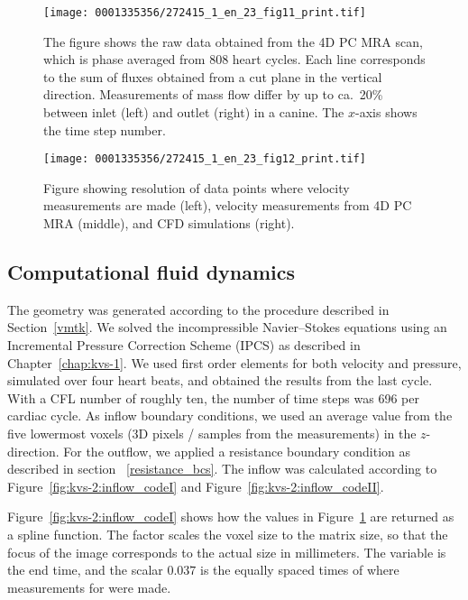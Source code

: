 \begin{figure}[!t]
  \centering
  \texttt{[image: 0001335356/272415\_1\_en\_23\_fig11\_print.tif]}
  \caption{The figure shows the raw data obtained from the 4D PC MRA scan,
    which is phase averaged from 808 heart cycles. Each line corresponds to
    the sum of fluxes obtained from a cut plane in the vertical direction.
    Measurements of mass flow differ by up to ca.~20\% between
    inlet (left) and outlet (right) in a canine. The $x$-axis shows
    the time step number.}
  \label{fig:kvs-2:mass_dog}\vspace*{10pt}
\end{figure}

\begin{figure}[!t]
  \centering
  \texttt{[image: 0001335356/272415\_1\_en\_23\_fig12\_print.tif]}
  \caption{Figure showing resolution of data points where velocity
    measurements are made (left), velocity measurements from 4D PC MRA
    (middle), and CFD simulations (right).}\label{fig:kvs-2:dog_mri}%
\end{figure}

\subsection{Computational fluid dynamics}

The geometry was generated according to the procedure described in
Section~\ref{vmtk}. We solved the incompressible Navier--Stokes
equations using an Incremental Pressure Correction Scheme (IPCS) as
described in Chapter~\ref{chap:kvs-1}. We used first order elements
for both velocity and pressure, simulated over four heart beats, and
obtained the results from the last cycle. With a CFL number of roughly
ten, the number of time steps was 696 per cardiac cycle. As inflow
boundary conditions, we used an average value from the five lowermost
voxels (3D pixels / samples from the measurements) in the
$z$-direction. For the outflow, we applied a resistance boundary
condition as described in section ~\ref{resistance_bcs}. The inflow
was calculated according to Figure~\ref{fig:kvs-2:inflow_codeI} and
Figure~\ref{fig:kvs-2:inflow_codeII}.

Figure~\ref{fig:kvs-2:inflow_codeI} shows how the values in
Figure~\ref{fig:kvs-2:mass_dog} are returned as a spline function. The
factor  scales the voxel size to the matrix size,
so that the focus of the image corresponds to the actual size in
millimeters. The  variable is the end time, and the scalar
$0.037$ is the equally spaced times of where measurements for 
were made.

